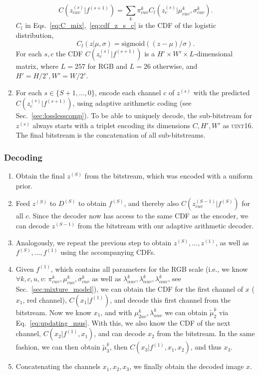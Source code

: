 \documentclass[10pt,twocolumn,letterpaper]{article}
\newcommand{\sigmoid}{\text{sigmoid}}
\begin{document}
\begin{enumerate}[leftmargin=*]
\begin{equation}
            C(z^{(s)}_{cuv} | f^{(s+1)}) = \sum_k \pi^k_{cuv} C_l(z^{(s)}_c | \mu^k_{cuv}, \sigma^k_{cuv}).
            \label{eq:cdf_z_s_c}
        \end{equation}
        $C_l$ in Eqs.~\eqref{eq:C_mix},~\eqref{eq:cdf_z_s_c} is the CDF of the logistic distribution, \[ C_l(z | \mu, \sigma) = \sigmoid((z-\mu)/\sigma). \]
        For each $s, c$ the CDF $C(z^{(s)}_{c} | f^{(s+1)})$ is a $H' \times W' \times L$-dimensional matrix, where $L=257$ for RGB and $L=26$ otherwise, and $H' = H/2^s, W' = W/2^s$. 
\item For each $s \in \{S+1, \dots, 0\}$, encode each channel $c$ of $z^{(s)}$ with the predicted $C(z^{(s)}_{c} | f^{(s+1)})$, using adaptive arithmetic coding (see Sec.~\ref{sec:losslesscomp}). To be able to uniquely decode, the sub-bitstream for $z^{(s)}$ always starts with a triplet encoding its dimensions $C, H', W'$ as \textsc{uint16}. The final bitstream is the concatenation of all sub-bitstreams.
\end{enumerate}

\subsubsection*{Decoding}
\begin{enumerate}[leftmargin=*]
    \item Obtain the final $z^{(S)}$ from the bitstream, which was encoded with a uniform prior.
    \item Feed $z^{(S)}$ to $D^{(S)}$ to obtain $f^{(S)}$, and thereby also $C(z^{(S-1)}_{cuv} | f^{(S)})$ for all $c$. Since the decoder now has access to the same CDF as the encoder, we can decode $z^{(S-1)}$ from the bitstream with our adaptive arithmetic decoder.
    \item Analogously, we repeat the previous step to obtain $z^{(S)}, \dots, z^{(1)}$, as well as $f^{(S)}, \dots, f^{(1)}$ using the accompanying CDFs.
    \item Given $f^{(1)}$, which contains all parameters for the RGB scale (i.e., we know $\forall k, c, u, v$: $\pi^k_{cuv}, \mu^k_{cuv}, \sigma^k_{cuv}$ as well as $\lambda^k_{\alpha uv}, \lambda^k_{\alpha uv}, \lambda^k_{\alpha uv}$, see Sec.~\ref{sec:mixture_model}), we can obtain the CDF for the first channel of $x$ ($x_1$, red channel), $C(x_1|f^{(1)})$, and decode this first channel from the bitstream. Now we know $x_1$, and with $\mu^k_{2uv}, \lambda_{\alpha uv}^k$ we can obtain $\tilde \mu^k_2$ via Eq.~\eqref{eq:updating_mus}. With this, we also know the CDF of the next channel, $C(x_2|f^{(1)}, x_1)$, and can decode $x_2$ from the bitstream. In the same fashion, we can then obtain $\tilde \mu_3^k$, then $C(x_3|f^{(1)}, x_1, x_2)$, and thus $x_3$.
    \item Concatenating the channels $x_1, x_2, x_3$, we finally obtain the decoded image $x$.
\end{enumerate}
\end{document}
